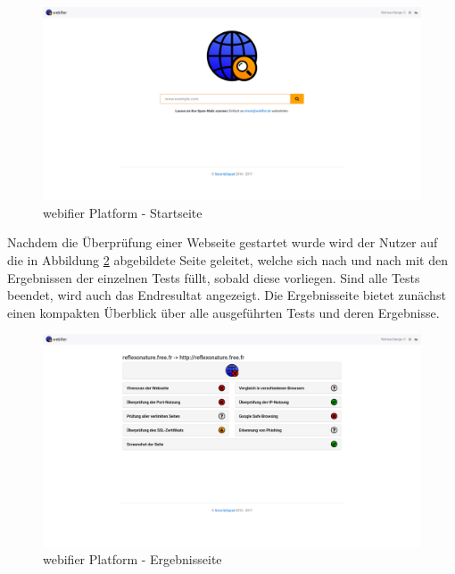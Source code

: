 \begin{figure}[H]
  \centering
  \includegraphics[width=\textwidth]{images/platform/screenshot-start}
  \caption[webifier Platform - Startseite]{webifier Platform - Startseite\protect\footnotemark}
  \label{fig:platform-start}
\end{figure}

Nachdem die Überprüfung einer Webseite gestartet wurde wird der Nutzer auf die in Abbildung \ref{fig:platform-result} abgebildete Seite geleitet, welche sich nach und nach mit den Ergebnissen der einzelnen Tests füllt, sobald diese vorliegen. Sind alle Tests beendet, wird auch das Endresultat angezeigt. Die Ergebnisseite bietet zunächst einen kompakten Überblick über alle ausgeführten Tests und deren Ergebnisse.

\begin{figure}[H]
  \centering
  \includegraphics[width=\textwidth]{images/platform/screenshot-reflexonature}
  \caption[webifier Platform - Ergebnisseite]{webifier Platform - Ergebnisseite\protect\footnotemark}
  \label{fig:platform-result}
\end{figure}

